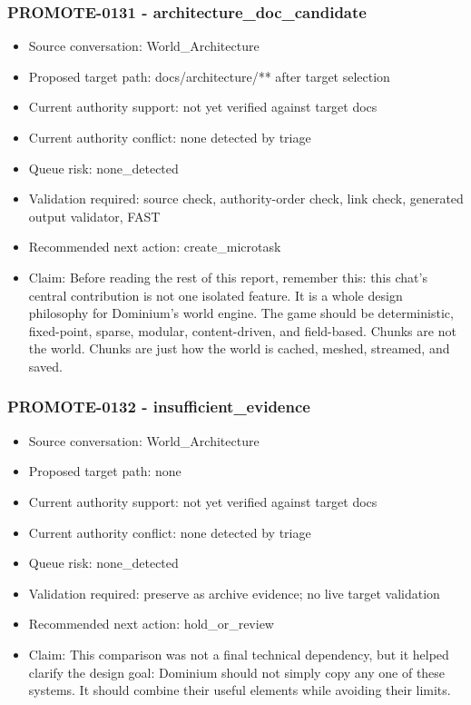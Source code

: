 \documentclass[11pt,a4paper]{report}
\begin{document}
\subsubsection{PROMOTE-0131 - architecture\_doc\_candidate}

\begin{itemize}
\item Source conversation: World\_Architecture
\item Proposed target path: docs/architecture/** after target selection
\item Current authority support: not yet verified against target docs
\item Current authority conflict: none detected by triage
\item Queue risk: none\_detected
\item Validation required: source check, authority-order check, link check, generated output validator, FAST
\item Recommended next action: create\_microtask
\item Claim: Before reading the rest of this report, remember this: this chat's central contribution is not one isolated feature. It is a whole design philosophy for Dominium's world engine. The game should be deterministic, fixed-point, sparse, modular, content-driven, and field-based. Chunks are not the world. Chunks are just how the world is cached, meshed, streamed, and saved.
\end{itemize}

\subsubsection{PROMOTE-0132 - insufficient\_evidence}

\begin{itemize}
\item Source conversation: World\_Architecture
\item Proposed target path: none
\item Current authority support: not yet verified against target docs
\item Current authority conflict: none detected by triage
\item Queue risk: none\_detected
\item Validation required: preserve as archive evidence; no live target validation
\item Recommended next action: hold\_or\_review
\item Claim: This comparison was not a final technical dependency, but it helped clarify the design goal: Dominium should not simply copy any one of these systems. It should combine their useful elements while avoiding their limits.
\end{itemize}
\end{document}

